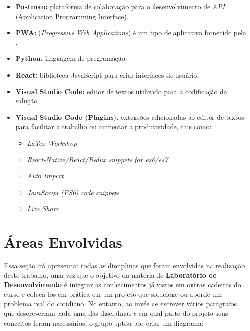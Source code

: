 \begin{itemize}
    \item \textbf{Postman:} plataforma de colaboração para o desenvolvimento de \textit{API} (Application Programming Interface).
    \item \textbf{PWA:} (\textit{Progressive Web Applications}) é um tipo de \software{} aplicativo fornecido pela \web{}.
    \item \textbf{Python:} linguagem de programação.
    \item \textbf{React:} biblioteca JavaScript para criar interfaces de usuário.
    \item \textbf{Visual Studio Code:} editor de textos utilizado para a codificação da solução.
    \item \textbf{Visual Studio Code (Plugins):} extensões adicionadas ao editor de textos para facilitar o trabalho ou aumentar a produtividade, tais como:
    \begin{itemize}
        \item \textit{LaTex Workshop}
        \item \textit{React-Native/React/Redux snippets for es6/es7}
        \item \textit{Auto Import}
        \item \textit{JavaScript (ES6) code snippets}
        \item \textit{Live Share}
    \end{itemize}
\end{itemize}




\section{Áreas Envolvidas}
\label{sec:areas_envolvidas}

Essa seção irá apresentar todas as disciplinas que foram envolvidas na realização deste trabalho, uma vez que o objetivo da matéria de \textbf{Laboratório de Desenvolvimento} é integrar os conhecimentos já vistos em outras cadeiras do curso e colocá-los em prática em um projeto que solucione ou aborde um problema real do cotidiano. No entanto, ao invés de escrever vários parágrafos que descreveriam cada uma das disciplinas e em qual parte do projeto seus conceitos foram necessários, o grupo optou por criar um diagrama:

